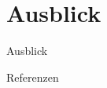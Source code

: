 \documentclass{beamer}
\begin{document}
	\section{Ausblick}
%
		\begin{frame}{Ausblick}
		\end{frame}
%
%
%
		\begin{frame}{Referenzen}
			\printbibliography
		\end{frame}
%
%
\end{document}
